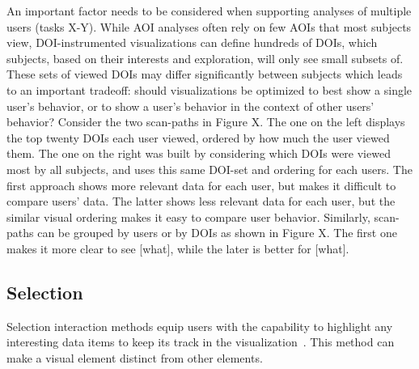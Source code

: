 An important factor needs to be considered when supporting analyses of multiple users (tasks X-Y). While AOI analyses often rely on few AOIs that most subjects view, DOI-instrumented visualizations can define hundreds of DOIs, which subjects, based on their interests and exploration, will only see small subsets of. These sets of viewed DOIs may differ significantly between subjects which leads to an important tradeoff: should visualizations be optimized to best show a single user's behavior, or to show a user's behavior in the context of other users' behavior? Consider the two scan-paths in Figure X. The one on the left displays the top twenty DOIs each user viewed, ordered by how much the user viewed them. The one on the right was built by considering which DOIs were viewed most by all subjects, and uses this same DOI-set and ordering for each users. The first approach shows more relevant data for each user, but makes it difficult to compare users' data. The latter shows less relevant data for each user, but the similar visual ordering makes it easy to compare user behavior. Similarly, scan-paths can be grouped by users or by DOIs as shown in Figure X. The first one makes it more clear to see [what], while the later is better for [what].


\subsection{Selection}
Selection interaction methods equip users with the capability to highlight any interesting data items to keep its track in the visualization~\cite{yi2007toward}. This method can make a visual element distinct from other elements. 

